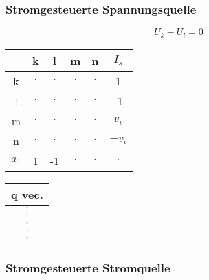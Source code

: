 \begin{multicols*}{2}
    
    \subsubsection{Stromgesteuerte Spannungsquelle}
    \begin{center}

        

        \[U_k - U_l = 0\]

        \begin{tabular}{c|c|c|c|c|c}
              & k & l & m & n & $I_s$  \\\hline
            k & $\cdot$ & $\cdot$ & $\cdot$ & $\cdot$ & 1 \\\hline
            l & $\cdot$ & $\cdot$ & $\cdot$ & $\cdot$ & -1 \\\hline
            m & $\cdot$ & $\cdot$ & $\cdot$ & $\cdot$ & $v_i$ \\\hline
            n & $\cdot$ & $\cdot$ & $\cdot$ & $\cdot$ & $-v_i$  \\\hline
            $a_1$ & 1 & -1 & $\cdot$ & $\cdot$ &$\cdot$ \\
        \end{tabular}
        \begin{tabular}{|c|}
            q vec. \\\hline
            $\cdot$ \\\hline
            $\cdot$ \\\hline
            $\cdot$ \\\hline
            $\cdot$ \\\hline
            $\cdot$ \\
        \end{tabular}
    \end{center}

    \newcolumn

    \subsubsection{Stromgesteuerte Stromquelle}
    \begin{center}


\end{center}
\end{multicols*}
